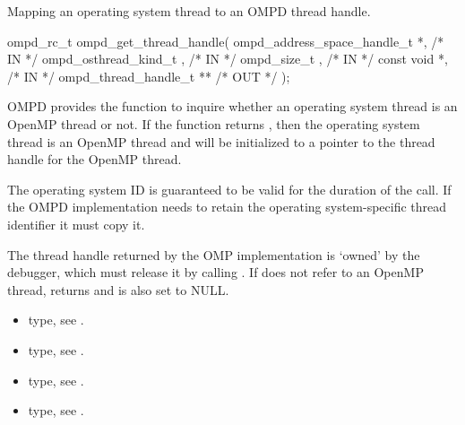 %
%
%
%
%
%
%


\summary
Mapping an operating system thread to an OMPD thread handle.
\format
\cspecificstart
\begin{boxedcode}
ompd\_rc\_t ompd\_get\_thread\_handle(
  ompd\_address\_space\_handle\_t   *,                            /* IN */
  ompd\_osthread\_kind\_t           ,                              /* IN */
  ompd\_size\_t                    ,                   /* IN */
  const void                    *,                          /* IN */
  ompd\_thread\_handle\_t         **                     /* OUT */
);
\end{boxedcode}
\cspecificend

\descr
OMPD provides the function 
to inquire whether an operating system thread is an OpenMP
thread or not.
If the function returns , then the operating
system thread is an OpenMP thread and 
will be initialized to a pointer to the thread handle for
the OpenMP thread.

\argdesc

The operating system ID  is guaranteed
to be valid for the duration of the call.
If the OMPD implementation needs to retain the operating system-specific
thread identifier it must copy it.

The thread handle  returned by the OMP implementation
is `owned' by the debugger, which must release it by calling
.
If  does not refer to an OpenMP thread,
 returns 
and  is also set to NULL.
\crossreferences
\begin{itemize}
	\item {} type, see .
	\item {} type, see .
	\item {} type, see .
	\item {} type, see .
\end{itemize}

